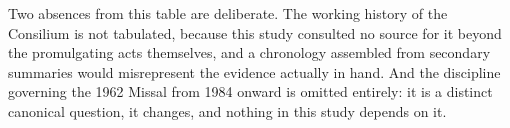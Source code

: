 Two absences from this table are deliberate. The working history of the Consilium is not
tabulated, because this study consulted no source for it beyond the promulgating acts themselves,
and a chronology assembled from secondary summaries would misrepresent the evidence actually in
hand. And the discipline governing the 1962 Missal from 1984 onward is omitted entirely: it is a
distinct canonical question, it changes, and nothing in this study depends on it.
